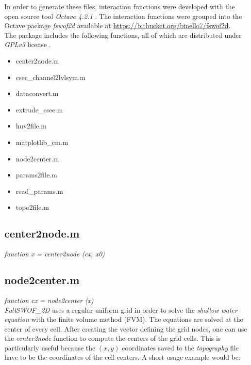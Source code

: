 In order to generate these files, interaction functions were developed with the open source tool \textit{Octave 4.2.1} \autocite{octave_community_gnu_2018}.
The interaction functions were grouped into the Octave package \textit{fswof2d} available at \url{https://bitbucket.org/binello7/fswof2d}.\\

The package includes the following functions, all of which are distributed under \textit {GPLv3} license \autocite{smith_quick_2014}.

\begin{itemize}
\itemsep0em
  \item center2node.m
  \item csec\_channel2lvlsym.m
  \item dataconvert.m
  \item extrude\_csec.m
  \item huv2file.m
  \item matplotlib\_cm.m
  \item node2center.m
  \item params2file.m
  \item read\_params.m
  \item topo2file.m
\end{itemize}

\subsection*{center2node.m}
\textit{function x = center2node (cx, x0)}\\


\subsection*{node2center.m}
\textit{function cx = node2center (x)}\\

\textit{FullSWOF\_2D} uses a regular uniform grid in order to solve the \emph{shallow water equation} with the finite volume method (FVM).
The equations are solved at the center of every cell.
After creating the vector defining the grid nodes, one can use the \textit{center2node} function to compute the centers of the grid cells.
This is particularly useful because the $(x,y)$ coordinates saved to the \textit{topography} file have to be the coordinates of the cell centers.
A short usage example would be:

